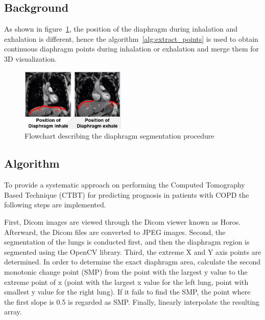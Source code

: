 \documentclass[default]{sn-jnl}
\begin{document}
\subsection{Background}\label{subsec:background}

As shown in figure~\ref{fig:diaphragm_position}, the position of the diaphragm during inhalation and exhalation is
different, hence the algorithm~\ref{alg:extract_points} is used to obtain continuous diaphragm points during inhalation
or exhalation and merge them for 3D visualization.

\begin{figure}[htp]
    \centering
    \includegraphics[width=5cm]{img/diaphragm_position}
    \caption{Flowchart describing the diaphragm segmentation procedure}
    \captionsetup{justification=centering}
    \label{fig:diaphragm_position}
\end{figure}

\subsection{Algorithm}\label{Algorithm}

To provide a systematic approach on performing the Computed Tomography Based Technique (CTBT) for predicting prognosis
in patients with COPD the following steps are implemented.

First, Dicom images are viewed through the Dicom viewer known as Horos. Afterward, the Dicom files are converted to JPEG
images. Second, the segmentation of the lungs is conducted first, and then the diaphragm region is segmented using the
OpenCV library. Third, the extreme X and Y axis points are determined. In order to determine the exact diaphragm area,
calculate the second monotonic change point (SMP) from the point with the largest y value to the extreme point of x
(point with the largest x value for the left lung, point with smallest y value for the right lung). If it fails to find
the SMP, the point where the first slope is 0.5 is regarded as SMP. Finally, linearly interpolate the resulting array.
\end{document}
